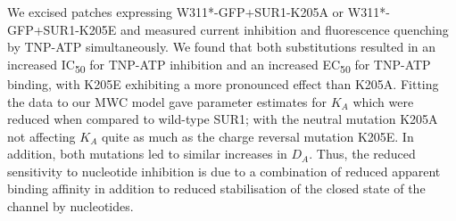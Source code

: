 We excised patches expressing W311*-GFP+SUR1-K205A or W311*-GFP+SUR1-K205E and measured current inhibition and fluorescence quenching by TNP-ATP simultaneously.
We found that both substitutions resulted in an increased IC\textsubscript{50} for TNP-ATP inhibition and an increased EC\textsubscript{50} for TNP-ATP binding, with K205E exhibiting a more pronounced effect than K205A.
Fitting the data to our MWC model gave parameter estimates for $K_A$ which were reduced when compared to wild-type SUR1; with the neutral mutation K205A not affecting $K_A$ quite as much as the charge reversal mutation K205E.
In addition, both mutations led to similar increases in $D_A$.
Thus, the reduced sensitivity to nucleotide inhibition is due to a combination of reduced apparent binding affinity in addition to reduced stabilisation of the closed state of the channel by nucleotides. 

